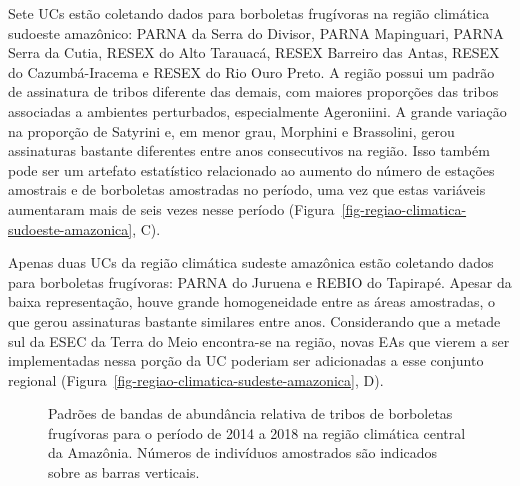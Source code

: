 \documentclass[
  letterpaper,
]{scrbook}
\begin{document}
Sete UCs estão coletando dados para borboletas frugívoras na região
climática sudoeste amazônico: PARNA da Serra do Divisor, PARNA
Mapinguari, PARNA Serra da Cutia, RESEX do Alto Tarauacá, RESEX Barreiro
das Antas, RESEX do Cazumbá-Iracema e RESEX do Rio Ouro Preto. A região
possui um padrão de assinatura de tribos diferente das demais, com
maiores proporções das tribos associadas a ambientes perturbados,
especialmente Ageroniini. A grande variação na proporção de Satyrini e,
em menor grau, Morphini e Brassolini, gerou assinaturas bastante
diferentes entre anos consecutivos na região. Isso também pode ser um
artefato estatístico relacionado ao aumento do número de estações
amostrais e de borboletas amostradas no período, uma vez que estas
variáveis aumentaram mais de seis vezes nesse período
(Figura~\ref{fig-regiao-climatica-sudoeste-amazonica}, C).

Apenas duas UCs da região climática sudeste amazônica estão coletando
dados para borboletas frugívoras: PARNA do Juruena e REBIO do Tapirapé.
Apesar da baixa representação, houve grande homogeneidade entre as áreas
amostradas, o que gerou assinaturas bastante similares entre anos.
Considerando que a metade sul da ESEC da Terra do Meio encontra-se na
região, novas EAs que vierem a ser implementadas nessa porção da UC
poderiam ser adicionadas a esse conjunto regional
(Figura~\ref{fig-regiao-climatica-sudeste-amazonica}, D).

\begin{figure}[H]


\caption{\label{fig-regiao-climatica-central-amazonica}Padrões de bandas
de abundância relativa de tribos de borboletas frugívoras para o período
de 2014 a 2018 na região climática central da Amazônia. Números de
indivíduos amostrados são indicados sobre as barras verticais.}

\end{figure}%
\end{document}
